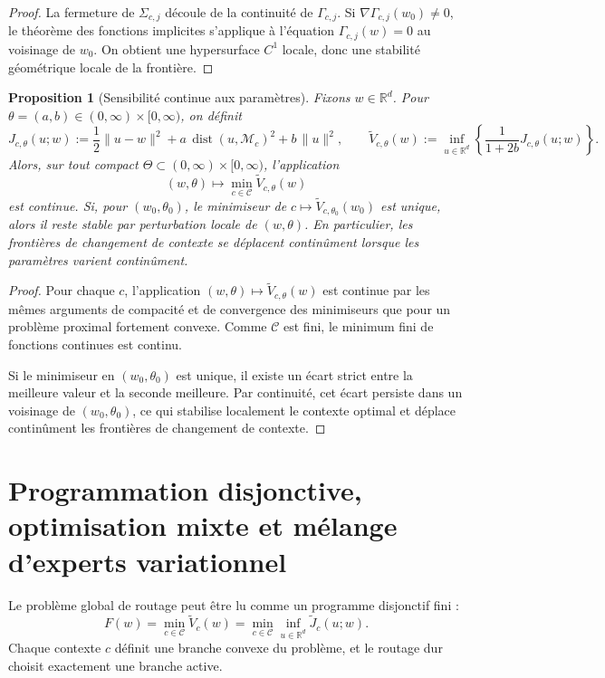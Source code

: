 \documentclass[11pt,a4paper]{article}
\newtheorem{proposition}{Proposition}[section]
\DeclareMathOperator{\dist}{dist}
\newcommand{\R}{\mathbb R}
\newcommand{\Mcal}{\mathcal M}
\newcommand{\Ccal}{\mathcal C}
\begin{document}
\begin{proof}
La fermeture de \(\Sigma_{c,j}\) découle de la continuité de \(\Gamma_{c,j}\). Si \(\nabla \Gamma_{c,j}(w_0)\neq 0\), le théorème des fonctions implicites s'applique à l'équation \(\Gamma_{c,j}(w)=0\) au voisinage de \(w_0\). On obtient une hypersurface \(C^1\) locale, donc une stabilité géométrique locale de la frontière.
\end{proof}

\begin{proposition}[Sensibilité continue aux paramètres]
Fixons \(w\in\R^d\). Pour \(\theta=(a,b)\in(0,\infty)\times[0,\infty)\), on définit
\[
J_{c,\theta}(u;w)
:=
\frac12\|u-w\|^2+a\,\dist(u,\Mcal_c)^2+b\,\|u\|^2,
\qquad
\widetilde V_{c,\theta}(w)
:=
\inf_{u\in\R^d}
\left\{
\frac{1}{1+2b}J_{c,\theta}(u;w)
\right\}.
\]
Alors, sur tout compact \(\Theta\subset(0,\infty)\times[0,\infty)\), l'application
\[
(w,\theta)\longmapsto \min_{c\in\Ccal}\widetilde V_{c,\theta}(w)
\]
est continue. Si, pour \((w_0,\theta_0)\), le minimiseur de \(c\mapsto \widetilde V_{c,\theta_0}(w_0)\) est unique, alors il reste stable par perturbation locale de \((w,\theta)\). En particulier, les frontières de changement de contexte se déplacent continûment lorsque les paramètres varient continûment.
\end{proposition}

\begin{proof}
Pour chaque \(c\), l'application \((w,\theta)\mapsto \widetilde V_{c,\theta}(w)\) est continue par les mêmes arguments de compacité et de convergence des minimiseurs que pour un problème proximal fortement convexe. Comme \(\Ccal\) est fini, le minimum fini de fonctions continues est continu.

Si le minimiseur en \((w_0,\theta_0)\) est unique, il existe un écart strict entre la meilleure valeur et la seconde meilleure. Par continuité, cet écart persiste dans un voisinage de \((w_0,\theta_0)\), ce qui stabilise localement le contexte optimal et déplace continûment les frontières de changement de contexte.
\end{proof}

\section{Programmation disjonctive, optimisation mixte et mélange d'experts variationnel}

Le problème global de routage peut être lu comme un programme disjonctif fini :
\[
F(w)=\min_{c\in\Ccal}\widetilde V_c(w)
=
\min_{c\in\Ccal}\inf_{u\in\R^d}\widetilde J_c(u;w).
\]
Chaque contexte \(c\) définit une branche convexe du problème, et le routage dur choisit exactement une branche active.
\end{document}
